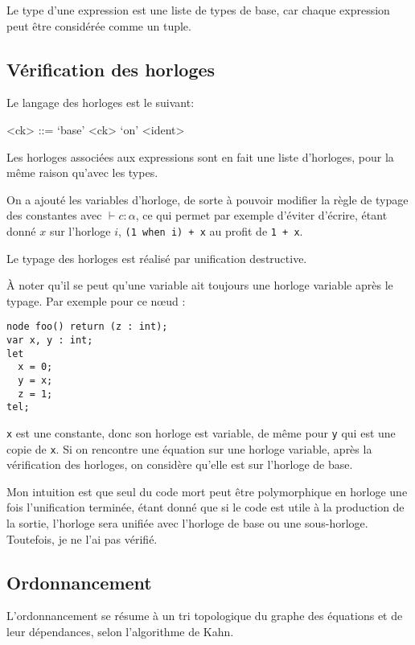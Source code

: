\documentclass{article}
\begin{document}
Le type d'une expression est une liste de types de base, car chaque expression
peut être considérée comme un tuple.

\subsection{Vérification des horloges}

Le langage des horloges est le suivant:
\begin{grammar}

   <ck> ::= \alpha \alt `base' \alt <ck> `on' <ident>

\end{grammar}

Les horloges associées aux expressions sont en fait une liste d'horloges, pour
la même raison qu'avec les types.

On a ajouté les variables d'horloge, de sorte à pouvoir modifier la
règle de typage des constantes avec \(\vdash c : \alpha \), ce qui
permet par exemple d'éviter d'écrire, étant donné \(x\) sur l'horloge \(i\),
\verb/(1 when i) + x/ au profit de \verb/1 + x/.

Le typage des horloges est réalisé par unification destructive.

À noter qu'il se peut qu'une variable ait toujours une horloge
variable après le typage. Par exemple pour ce nœud :
\begin{verbatim}
node foo() return (z : int);
var x, y : int;
let
  x = 0;
  y = x;
  z = 1;
tel;
\end{verbatim}

\verb+x+ est une constante, donc son horloge est variable, de même
pour \verb+y+ qui est une copie de \verb+x+. Si on rencontre une
équation sur une horloge variable, après la vérification des horloges,
on considère qu'elle est sur l'horloge de base.

Mon intuition est que seul du code mort peut être polymorphique en horloge une
fois l'unification terminée, étant donné que si le code est utile à la
production de la sortie, l'horloge sera unifiée avec l'horloge de base ou une
sous-horloge. Toutefois, je ne l'ai pas vérifié.

\subsection{Ordonnancement}

L'ordonnancement se résume à un tri topologique du graphe des équations et de
leur dépendances, selon l'algorithme de Kahn.
\end{document}
